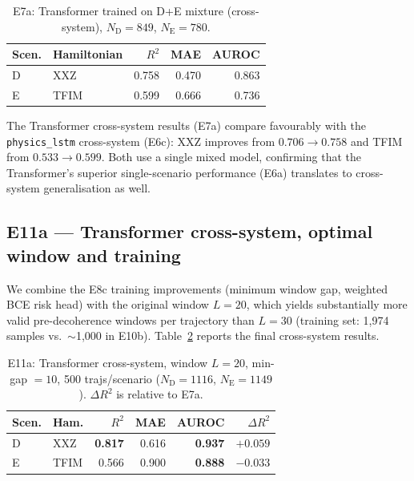 \documentclass[twocolumn,10pt]{article}
\begin{document}
\begin{table}[h]
\centering
\caption{E7a: Transformer trained on D+E mixture (cross-system),
  $N_\mathrm{D}=849$, $N_\mathrm{E}=780$.\label{tab:e7a}}
\small
\begin{tabular}{llrrr}
\toprule
Scen. & Hamiltonian & $R^2$ & MAE & AUROC \\
\midrule
D & XXZ  & 0.758 & 0.470 & 0.863 \\
E & TFIM & 0.599 & 0.666 & 0.736 \\
\bottomrule
\end{tabular}
\end{table}

The Transformer cross-system results (E7a) compare favourably with the
\texttt{physics\_lstm} cross-system (E6c): XXZ improves from $0.706
\to 0.758$ and TFIM from $0.533 \to 0.599$.
Both use a single mixed model, confirming that the Transformer's superior
single-scenario performance (E6a) translates to cross-system
generalisation as well.

\subsection{E11a --- Transformer cross-system, optimal window and training}
\label{sec:e11a}

We combine the E8c training improvements (minimum window gap, weighted
BCE risk head) with the original window $L=20$, which yields substantially
more valid pre-decoherence windows per trajectory than $L=30$
(training set: 1{,}974 samples vs.\ $\sim$1{,}000 in E10b).
Table~\ref{tab:e11a} reports the final cross-system results.

\begin{table}[h]
\centering
\caption{E11a: Transformer cross-system, window $L=20$, min-gap $=10$,
  500 trajs/scenario ($N_\mathrm{D}=1116$, $N_\mathrm{E}=1149$).
  $\Delta R^2$ is relative to E7a.
  \label{tab:e11a}}
\footnotesize
\setlength{\tabcolsep}{3pt}
\begin{tabular}{llrrrr}
\toprule
Scen. & Ham. & $R^2$ & MAE & AUROC & $\Delta R^2$ \\
\midrule
D & XXZ  & \textbf{0.817} & 0.616 & \textbf{0.937} & $+0.059$ \\
E & TFIM & 0.566 & 0.900 & \textbf{0.888} & $-0.033$ \\
\bottomrule
\end{tabular}
\end{table}
\end{document}

